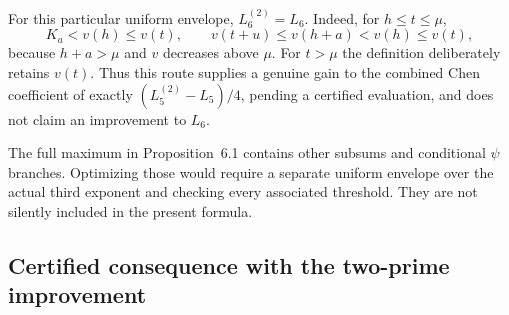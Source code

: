 \documentclass[11pt]{article}
\begin{document}
For this particular uniform envelope, $L_6^{(2)}=L_6$.
Indeed, for $h\le t\le\mu$,
\[
 K_a<v(h)\le v(t),\qquad
 v(t+u)\le v(h+a)<v(h)\le v(t),
\]
because $h+a>\mu$ and $v$ decreases above $\mu$.
For $t>\mu$ the definition deliberately retains $v(t)$.
Thus this route supplies a genuine gain to the combined Chen
coefficient of exactly $(L_5^{(2)}-L_5)/4$, pending a certified
evaluation, and does not claim an improvement to $L_6$.

The full maximum in Proposition~6.1 contains other subsums and
conditional $\psi$ branches. Optimizing those would require a
separate uniform envelope over the actual third exponent and
checking every associated threshold. They are not silently
included in the present formula.

\subsection{Certified consequence with the two-prime improvement}
\label{sec:double-prefix-corollary}
\end{document}
